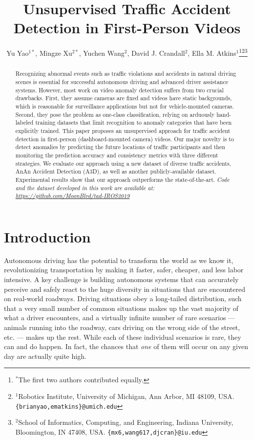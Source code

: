 \documentclass[letterpaper, 10 pt, conference]{ieeeconf}
\title{\LARGE \bf
Unsupervised Traffic Accident Detection in First-Person Videos
}
\author{Yu Yao$^{1*}$, Mingze Xu$^{2*}$, Yuchen Wang$^{2}$, David J. Crandall$^{2}$, Ella M. Atkins$^{1}$\thanks{$^{*}$The first two authors contributed equally.}\thanks{$^{1}$Robotics Institute, University of Michigan, Ann Arbor, MI 48109, USA.
{\tt\footnotesize \{brianyao,ematkins\}@umich.edu}}\thanks{$^{2}$School of Informatics, Computing, and Engineering, Indiana University, Bloomington, IN 47408, USA.
{\tt\footnotesize \{mx6,wang617,djcran\}@iu.edu}}}
\theoremstyle{definition}
\theoremstyle{remark}
\begin{document}
\maketitle
\thispagestyle{empty}
\pagestyle{empty}

\begin{abstract}
    Recognizing abnormal events such as traffic violations and
    accidents in natural driving scenes is essential for successful
    autonomous driving and advanced driver assistance systems. However, most
    work on video anomaly detection suffers from two crucial
    drawbacks.  First, they assume cameras are fixed and videos have
    static backgrounds, which is reasonable for surveillance
    applications but not for vehicle-mounted cameras.
    Second, they pose the problem as one-class classification, 
    relying on arduously hand-labeled training datasets that limit
    recognition to anomaly categories that have been explicitly trained.
    This paper proposes an unsupervised approach for traffic
    accident detection in first-person (dashboard-mounted camera) videos.
    Our major novelty is to detect anomalies by predicting the future
    locations of traffic participants and then monitoring the
    prediction accuracy and consistency metrics with three different
    strategies. We evaluate our approach using a new dataset of diverse traffic
    accidents, AnAn Accident Detection (A3D), as well as another
    publicly-available dataset. Experimental results show that our approach
    outperforms the state-of-the-art. \textit{Code and the dataset developed in this work are available at:
    \url{https://github.com/MoonBlvd/tad-IROS2019}}
\end{abstract}

\section{Introduction}

Autonomous driving has the potential to transform the world as we know
it, revolutionizing transportation by making it faster,
safer, cheaper, and less labor intensive. A key challenge is building
autonomous systems that can accurately perceive and
safely react to the huge diversity in situations that are encountered
on real-world roadways. Driving situations obey
a long-tailed distribution, such that a very small number of common
situations makes up the vast majority of what a driver encounters, and
a virtually infinite number of rare scenarios --- animals running into
the roadway, cars driving on the wrong side of the street, etc. ---
makes up the rest. While each of these individual scenarios is rare,
they can and do happen. In fact, the chances that \textit{one} of them
will occur on any given day are actually quite high.
\end{document}
